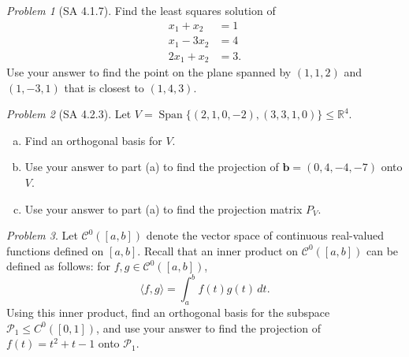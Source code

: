\documentclass[11pt]{paper}
\theoremstyle{remark}
\newtheorem{problem}{Problem}
\newtheorem*{solution}{{\bf Solution}}
\newcommand\R{\fld{R}}
\renewcommand{\vec}[1]{\mathbf{#1}}
\newcommand{\<}{\ensuremath{\langle}}
\renewcommand{\>}{\ensuremath{\rangle}}
\newcommand\fld[1]{\ensuremath{\mathbb{#1}}}
\newcommand\vb{\vec{b}}
\newcommand\Span{\ensuremath{\operatorname{Span}}}
\begin{document}
\newpage


\begin{problem}[SA 4.1.7]
Find the least squares solution of
\begin{align*}
x_1 +x_2 &= 1\\
x_1 - 3x_2 &= 4\\
2x_1 +x_2 &= 3.
\end{align*}
Use your answer to find the point on the plane spanned by $(1, 1, 2)$ and 
$(1, -3, 1)$ that is closest to $(1, 4, 3)$. 
\end{problem}


\newpage
\begin{problem}[SA 4.2.3]
Let $V = \Span \{(2, 1, 0, -2), (3, 3, 1, 0)\}\leq \R^4$.
\begin{enumerate}[(a)]
\item 
Find an orthogonal basis for $V$.
\item Use your answer to part (a) to find the projection of 
  $\vb = (0, 4, -4, -7)$ onto $V$.
\item Use your answer to part (a) to find the projection matrix $P_V$.
\end{enumerate}
\end{problem}

\newpage

\begin{problem}
Let $\mathcal{C}^0([a, b])$ denote the vector space of continuous real-valued
functions defined on $[a,b]$. Recall that an inner product on 
$\mathcal{C}^0([a, b])$ can be defined as follows: 
for $f, g \in \mathcal{C}^0([a, b])$,
\[
\<f, g\> =
\int^b_a f(t)g(t)\, dt.
\]
Using this inner product, find an orthogonal basis for the 
subspace $\mathcal{P}_1 \leq C^0([0, 1])$,
and use your answer to find the projection
of $f(t) = t^2 + t - 1$ onto $\mathcal{P}_1$.
\end{problem}
\end{document}
